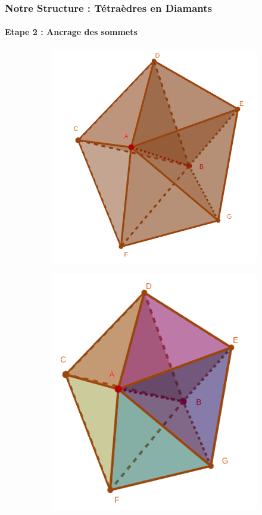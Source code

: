 \documentclass[9pt]{beamer}
\begin{document}
\begin{frame}
\frametitle{Notre Structure : Tétraèdres en Diamants}
\framesubtitle{Etape 2 : Ancrage des sommets}
\begin{figure}[H]
\centering
\begin{subfigure}{.32\textwidth}
  \centering
  \includegraphics[scale=0.16]{Images/central_edge_AB}
  \caption{}
  \label{fig:central_edge_AB}
\end{subfigure}%
\begin{subfigure}{.32\textwidth}
  \centering
  \includegraphics[scale=0.20]{Images/explosion_diamond}

\end{subfigure}
\end{figure}
\end{frame}
\end{document}
